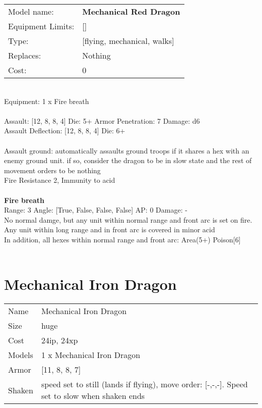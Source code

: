\noindent
\begin{tabular}{ll}
Model name: &{\bf Mechanical Red Dragon } \\
Equipment Limits: &[] \\
Type: &[flying, mechanical, walks] \\
Replaces: &Nothing \\
Cost: & 0\\
\end{tabular}
\ \\
Equipment: 1 x Fire breath \\
\ \\
Assault: [12, 8, 8, 4] Die: 5+ Armor Penetration: 7 Damage: d6 \\
Assault Deflection: [12, 8, 8, 4] Die: 6+\\
\indent  
\ \\
Assault ground: automatically assaults ground troops if it shares a hex with an enemy ground unit. if so, consider the dragon to be in slow state and the rest of movement orders to be nothing\\ 
Fire Resistance 2, Immunity to acid\\ 

\ \\
{\bf Fire breath } \\



Range: 3  Angle: [True, False, False, False] AP: 0 Damage: - \\
No normal damge, but any unit within normal range and front arc is set on fire. Any unit within long range and in front arc is covered in minor acid\\ 
In addition, all hexes within normal range and front arc: Area(5+) Poison[6]\\ 




 
\ \\













\clearpage

\section{ Mechanical Iron Dragon }

\begin{tabular}{ll}
  Name & Mechanical Iron Dragon \\
  Size & huge\\
  Cost & 24ip, 24xp\\
  Models & 1 x Mechanical Iron Dragon\\
  Armor & [11, 8, 8, 7]\\
  Shaken & speed set to still (lands if flying), move order: [-,-,-]. Speed set to slow when shaken ends\\
\end{tabular}

